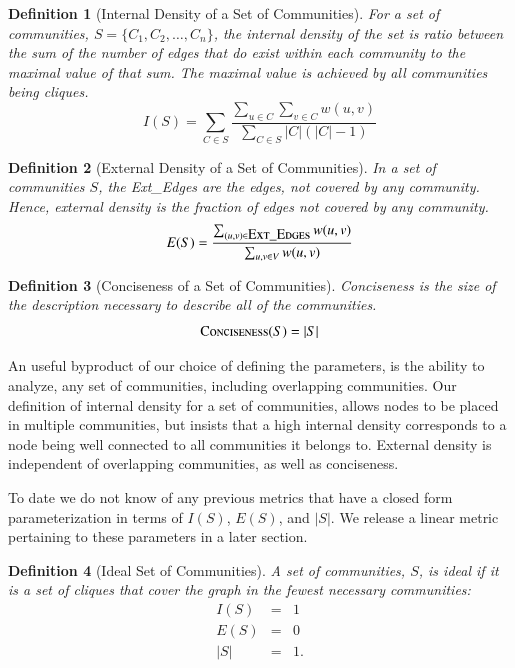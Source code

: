 \documentclass[phd,tocprelim]{cornell}
\newtheorem{definition}{Definition}
\begin{document}
\begin{definition}[Internal Density of a Set of Communities] For a set of communities, $S = \{C_1, C_2, \dots, C_n\}$, the internal density of the set is ratio between the sum of the number of edges that do exist within each community to the maximal value of that sum.  The maximal value is achieved by all communities being cliques.
\begin{equation}
I(S) = \sum_{C \in S} \frac{\sum_{u \in C} \sum_{v \in C} w(u,v)}{\sum_{C \in S}|C|(|C| - 1)}
\end{equation}
\label{def_int_set}
\end{definition}

\begin{definition}[External Density of a Set of Communities] In a set of communities $S$, the {\sc Ext\_Edges} are the edges, not covered by any community.  Hence, external density is the fraction of edges not covered by any community.
\begin{equation}
E(S) = \frac{\sum_{(u, v) \in \mbox{\sc Ext\_Edges}} w(u,v)} {\sum_{u,v \in V}w(u,v)}
\end{equation}
\label{def_ext_set}
\end{definition}

\begin{definition}[Conciseness of a Set of Communities]  Conciseness is the size of the description necessary to describe all of the communities.
\begin{equation}
\mbox{\sc Conciseness}(S) = |S|
\end{equation}
\label{def_conciseness}
\end{definition}

An useful byproduct of our choice of defining the parameters, is the ability to analyze, any set of communities, including overlapping communities.  Our definition of internal density for a set of communities, allows nodes to be placed in multiple communities, but insists that a high internal density corresponds to a node being well connected to all communities it belongs to.  External density is independent of overlapping communities, as well as conciseness.

To date we do not know of any previous metrics that have a closed form parameterization in terms of $I(S)$, $E(S)$, and $|S|$. We release a linear metric pertaining to these parameters in a later section.
\begin{definition}[Ideal Set of Communities]
A set of communities, $S$, is ideal if it is a set of cliques that cover the graph in the fewest necessary communities:
\begin{eqnarray*}
I(S) &=& 1\\
 E(S) &=& 0 \\
|S| &=& 1.
\end{eqnarray*}
\end{definition}
\end{document}
